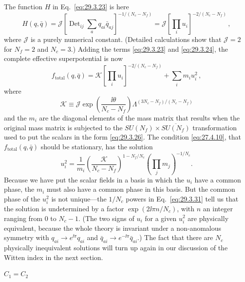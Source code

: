 The function \(H\) in Eq.~\eqref{eq:29.3.23} is here
\begin{equation}
  H(q,\bar q)
  =
  \mathcal{J}
  \left[
    \operatorname{Det}_{ij}\sum_a q_{ai}\bar q_{aj}
  \right]^{-1/(N_c-N_f)}
  =
  \mathcal{J}
  \left[\prod_i u_i\right]^{-2/(N_c-N_f)}\,,
  \tag{29.3.28}\label{eq:29.3.28}
\end{equation}
where \(\mathcal{J}\) is a purely numerical constant. (Detailed
calculations show that \(\mathcal{J}=2\) for \(N_f=2\) and \(N_c=3\).)
Adding the terms \eqref{eq:29.3.23} and \eqref{eq:29.3.24}, the complete
effective superpotential is now
\begin{equation}
  f_{\mathrm{total}}(q,\bar q)
  =
  \mathcal{K}
  \left[\prod_i u_i\right]^{-2/(N_c-N_f)}
  +\sum_i m_i u_i^2\,,
  \tag{29.3.29}\label{eq:29.3.29}
\end{equation}
where
\begin{equation}
  \mathcal{K}
  \equiv
  \mathcal{J}
  \exp\left(\frac{\ii\theta}{N_c-N_f}\right)
  \Lambda^{(3N_c-N_f)/(N_c-N_f)}
  \tag{29.3.30}\label{eq:29.3.30}
\end{equation}
and the \(m_i\) are the diagonal elements of the mass matrix that results
when the original mass matrix is subjected to the
\(SU(N_f)\times\overline{SU(N_f)}\) transformation used to put
the scalars in the form \eqref{eq:29.3.26}. The condition
\eqref{eq:27.4.10}, that \(f_{\mathrm{total}}(q,\bar q)\) should be
stationary, has the solution
\begin{equation}
  u_i^2
  =
  \frac{1}{m_i}
  \left(\frac{\mathcal{K}}{N_c-N_f}\right)^{1-N_f/N_c}
  \left(\prod_j m_j\right)^{-1/N_c}.
  \tag{29.3.31}\label{eq:29.3.31}
\end{equation}
Because we have put the scalar fields in a basis in which the \(u_i\) have
a common phase, the \(m_i\) must also have a common phase in this basis.
But the common phase of the \(u_i^2\) is not unique---the \(1/N_c\) powers
in Eq.~\eqref{eq:29.3.31} tell us that the solution is undetermined by a
factor \(\exp(2\ii\pi n/N_c)\), with \(n\) an integer ranging from 0 to
\(N_c-1\). (The two signs of \(u_i\) for a given \(u_i^2\) are physically
equivalent, because the whole theory is invariant under a non-anomalous
symmetry with \(q_{ai}\longrightarrow e^{\ii\pi}q_{ai}\) and
\(\bar q_{ai}\longrightarrow e^{-\ii\pi}\bar q_{ai}\).) The fact that there
are \(N_c\) physically inequivalent solutions will turn up again in our
discussion of the Witten index in the next section.

\begin{center}
  \(C_1=C_2\)
\end{center}

